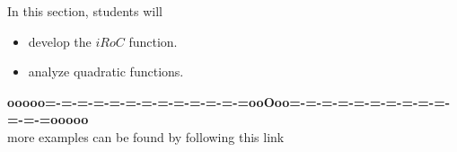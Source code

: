 \documentclass{ximera}
\begin{document}
\begin{sectionOutcomes}
In this section, students will 

\begin{itemize}
\item develop the $iRoC$ function.
\item analyze quadratic functions.
\end{itemize}
\end{sectionOutcomes}















\begin{center}
\textbf{\textcolor{green!50!black}{ooooo=-=-=-=-=-=-=-=-=-=-=-=-=ooOoo=-=-=-=-=-=-=-=-=-=-=-=-=ooooo}} \\

more examples can be found by following this link\\ 

\end{center}
\end{document}
